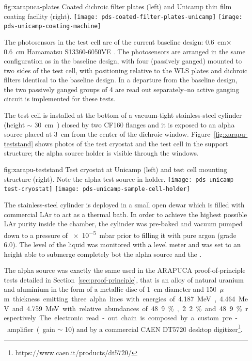 \begin{dunefigure}{fig:xarapuca-plates}
{Coated dichroic filter plates (left) and Unicamp thin film coating facility (right).} 
	\texttt{[image: pds-coated-filter-plates-unicamp]}\quad
	\texttt{[image: pds-unicamp-coating-machine]}
\end{dunefigure}

The photosensors in the test cell are of the current baseline design:  \SI{0.6}{cm}$\times$\SI{0.6}{cm} Hamamatsu S13360-6050VE .  The photosensors are arranged in the same configuration as in the baseline design, with four  (passively ganged) mounted to two sides of the test cell, with positioning relative to the WLS plates and dichroic filters identical to the baseline design.  In a departure from the baseline design, the two passively ganged groups of 4  are read out separately--no active ganging circuit is implemented for these tests. 

The test cell is installed at the bottom of a  vacuum-tight  stainless-steel cylinder (height $\sim$ \SI{30}{cm)} closed by two CF160 flanges and it is exposed to an alpha source placed at \SI{3}{cm} from the center of the dichroic window. Figure~\ref{fig:xarapu-teststand} shows photos of the test cryostat and the test cell in the support structure; the alpha source holder is visible through the windows.

\begin{dunefigure}{fig:xarapu-teststand}
{Test cryostat at Unicamp (left) and  test cell mounting structure (right).  Note the alpha test source in holder.} 
	\texttt{[image: pds-unicamp-test-cryostat]} \quad
	\texttt{[image: pds-unicamp-sample-cell-holder]}
\end{dunefigure}  

The stainless-steel cylinder  is deployed in a small open dewar which is filled with commercial LAr to act as a thermal bath. In order to achieve the highest possible LAr purity inside the  chamber, the cylinder was pre-baked and vacuum pumped down to a pressure of \SI{e-5}{mbar}  %
prior to filling it with pure argon (grade 6.0). The level of the liquid was monitored with a level meter and was set to an height able to submerge completely bot the alpha source and the . 

The alpha source was exactly the same used in the ARAPUCA proof-of-principle tests detailed in Section~\ref{sec:proof-principle}, that is an alloy of natural uranium and aluminium in the form of a metallic disc of \SI{1}{cm} diameter and \SI{150}{$\mu$m} thickness emitting three alpha lines with energies of  \SI{4.187}{MeV}, \SI{4.464}{MeV} and  \SI{4.759}{MeV} with relative abundances of 48.9\%, 2.2\% and 48.9\% respectively.  The electronic read-out chain is composed by a custom pre-amplifier (gain $\sim$ 10) and by a commercial CAEN DT5720 desktop digitizer\footnote{https://www.caen.it/products/dt5720/}.

